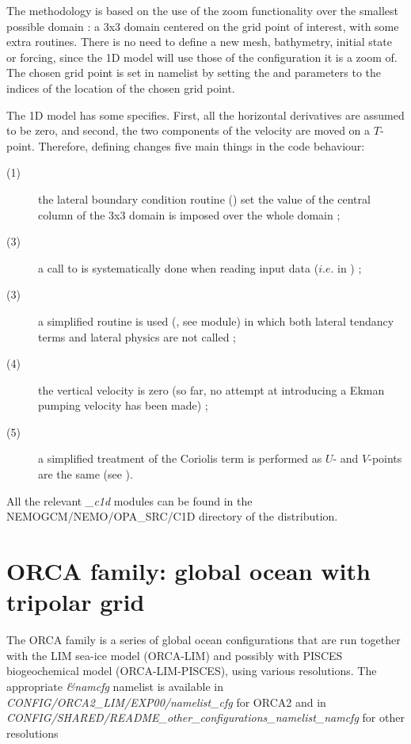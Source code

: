 The methodology is based on the use of the zoom functionality over the smallest possible 
domain : a 3x3 domain centered on the grid point of interest, 
with some extra routines. There is no need to define a new mesh, bathymetry, 
initial state or forcing, since the 1D model will use those of the configuration it is a zoom of. 
The chosen grid point is set in \textit{} namelist by setting the  and  
parameters to the indices of the location of the chosen grid point.

The 1D model has some specifies. First, all the horizontal derivatives are assumed to be zero, and
second, the two components of the velocity are moved on a $T$-point. 
Therefore, defining  changes five main things in the code behaviour: 
\begin{description}
\item[(1)] the lateral boundary condition routine () set the value of the central column 
of the 3x3 domain is imposed over the whole domain ; 
\item[(3)] a call to  is systematically done when reading input data ($i.e.$ in ) ; 
\item[(3)] a simplified  routine is used (, see  module) in which 
both lateral tendancy terms and lateral physics are not called ; 
\item[(4)] the vertical velocity is zero (so far, no attempt at introducing a Ekman pumping velocity 
has been made) ; 
\item[(5)] a simplified treatment of the Coriolis term is performed as $U$- and $V$-points are the same 
(see ).
\end{description}
All the relevant \textit{\_c1d} modules can be found in the NEMOGCM/NEMO/OPA\_SRC/C1D directory of 
the \NEMO distribution.


\section{ORCA family: global ocean with tripolar grid }
\label{CFG_orca}

The ORCA family is a series of global ocean configurations that are run together with 
the LIM sea-ice model (ORCA-LIM) and possibly with PISCES biogeochemical model 
(ORCA-LIM-PISCES), using various resolutions.
The appropriate \textit{\&namcfg} namelist is available in \textit{CONFIG/ORCA2\_LIM/EXP00/namelist\_cfg} 
for ORCA2 and in \textit{CONFIG/SHARED/README\_other\_configurations\_namelist\_namcfg} 
for other resolutions


